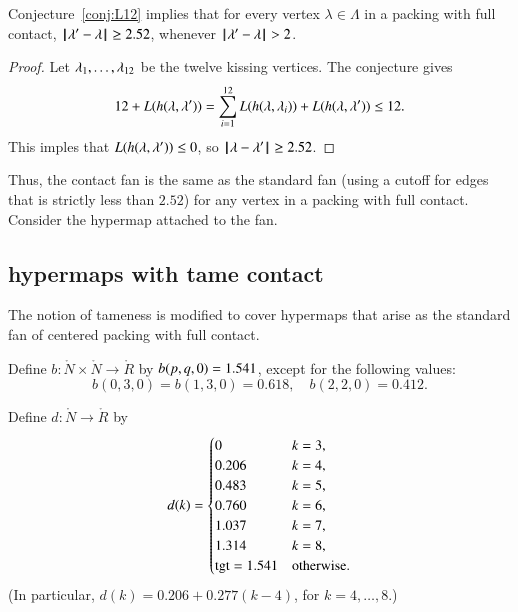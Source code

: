 \begin{lemma}  Conjecture~\ref{conj:L12} implies that for every vertex $\lambda\in\Lambda$ in a packing with full contact, ${\hskip0.1em|\hskip-0.15em|\hskip0.1em}\lambda' - \lambda{\hskip0.1em|\hskip-0.15em|\hskip0.1em}\ge 2.52$, whenever ${\hskip0.1em|\hskip-0.15em|\hskip0.1em}\lambda' - \lambda{\hskip0.1em|\hskip-0.15em|\hskip0.1em}> 2$.
\end{lemma}
%
%

\begin{proof} Let $\lambda_1,\ldots,\lambda_{12}$ be the twelve kissing vertices.  The conjecture gives
$$
12 + L(h(\lambda,\lambda')) = \sum_{i=1}^{12} L(h(\lambda,\lambda_i)) + L(h(\lambda,\lambda')) \le 12.
$$
This imples that $L(h(\lambda,\lambda'))\le 0$, so ${\hskip0.1em|\hskip-0.15em|\hskip0.1em}\lambda - \lambda'{\hskip0.1em|\hskip-0.15em|\hskip0.1em}\ge 2.52$.
\end{proof}

Thus, the contact fan is the same as the standard fan (using a cutoff for edges that is strictly less than $2.52$) for any vertex in a packing with full contact.  Consider the hypermap attached to the fan.
%
%


\subsection{hypermaps with tame contact}

The notion of tameness is modified to cover hypermaps that arise as the standard fan of centered packing with full contact.  
%
%

\begin{definition}[b]
Define $b:\ring{N}\times \ring{N}\to \ring{R}$ by $b(p,q,0)=1.541$,   except for the following values:
$$
b(0,3,0)=b(1,3,0)=0.618,\quad b(2,2,0)=0.412.
$$
\end{definition}
%

\begin{definition}[d]
    Define $d:\ring{N}\to \ring{R}$ by
  $$d(k) = \begin{cases}
    0 & k=3, \\
    0.206 & k=4, \\
    0.483 & k=5, \\
    0.760 & k=6, \\
    1.037 & k=7, \\
    1.314 & k=8,\\
    {\operatorname{tgt}}=1.541 & \text{otherwise}.
  \end{cases}
  $$
(In particular, $d(k) = 0.206 + 0.277 (k-4)$, for $k=4,\ldots,8$.)
\end{definition}
%

